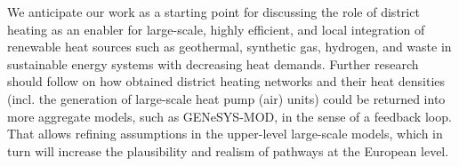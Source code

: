 We anticipate our work as a starting point for discussing the role of district heating as an enabler for large-scale, highly efficient, and local integration of renewable heat sources such as geothermal, synthetic gas, hydrogen, and waste in sustainable energy systems with decreasing heat demands. Further research should follow on how obtained district heating networks and their heat densities (incl. the generation of large-scale heat pump (air) units) could be returned into more aggregate models, such as GENeSYS-MOD, in the sense of a feedback loop. That allows refining assumptions in the upper-level large-scale models, which in turn will increase the plausibility and realism of pathways at the European level.


